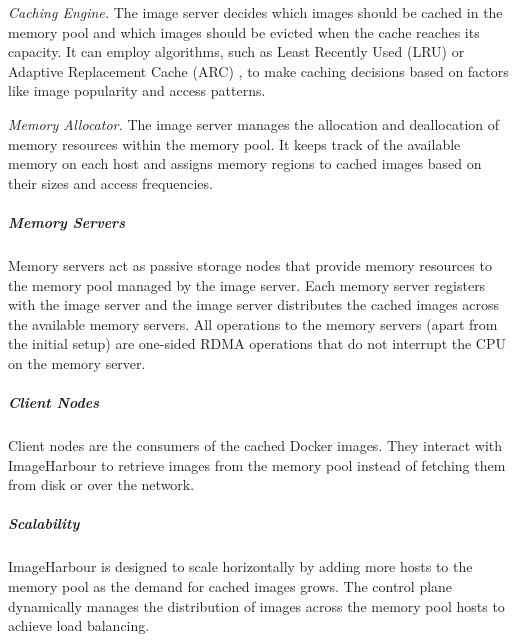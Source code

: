 \noindent\textit{Caching Engine.} The image server decides which images should be cached in the memory pool and which images should be evicted when the cache reaches its capacity. It can employ algorithms, such as Least Recently Used (LRU) or Adaptive Replacement Cache (ARC) \cite{megiddo2003arc}, to make caching decisions based on factors like image popularity and access patterns.

\noindent\textit{Memory Allocator.} The image server manages the allocation and deallocation of memory resources within the memory pool. It keeps track of the available memory on each host and assigns memory regions to cached images based on their sizes and access frequencies.

\subparagraph{\textbf{Memory Servers}}
Memory servers act as passive storage nodes that provide memory resources to the memory pool managed by the image server. Each memory server registers with the image server and the image server distributes the cached images across the available memory servers. All operations to the memory servers (apart from the initial setup) are one-sided RDMA operations that do not interrupt the CPU on the memory server. 

\subparagraph{\textbf{Client Nodes}}
Client nodes are the consumers of the cached Docker images. They interact with ImageHarbour to retrieve images from the memory pool instead of fetching them from disk or over the network.

\subparagraph{\textbf{Scalability}}
ImageHarbour is designed to scale horizontally by adding more hosts to the memory pool as the demand for cached images grows. The control plane dynamically manages the distribution of images across the memory pool hosts to achieve load balancing.
